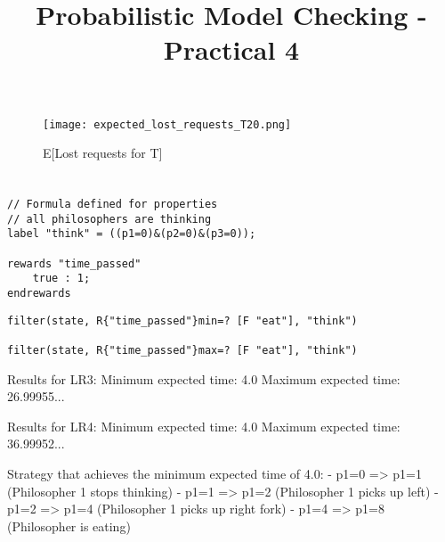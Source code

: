 \documentclass[12pt]{article}
\title{Probabilistic Model Checking - Practical 4}
\date{}
\begin{document}
\maketitle

\section {}

\clearpage


\section{}

\begin{figure}[H]
  \caption{E[Lost requests for T]}
  \centering
	\texttt{[image: expected\_lost\_requests\_T20.png]}
\end{figure}

\section{}

\begin{lstlisting}[caption="Reward structure for expected time"]
// Formula defined for properties
// all philosophers are thinking
label "think" = ((p1=0)&(p2=0)&(p3=0));

rewards "time_passed"
	true : 1;
endrewards
\end{lstlisting}

\begin{lstlisting}[caption="Properties for minimum and maximum expected time to eating", language=pctl]
filter(state, R{"time_passed"}min=? [F "eat"], "think")

filter(state, R{"time_passed"}max=? [F "eat"], "think")
\end{lstlisting}

Results for LR3:
  Minimum expected time: 4.0
  Maximum expected time: 26.99955...

Results for LR4:
  Minimum expected time: 4.0
  Maximum expected time: 36.99952...

Strategy that achieves the minimum expected time of 4.0:
    - p1=0 => p1=1 (Philosopher 1 stops thinking)
    - p1=1 => p1=2 (Philosopher 1 picks up left)
    - p1=2 => p1=4 (Philosopher 1 picks up right fork)
    - p1=4 => p1=8 (Philosopher is eating)
\end{document}
